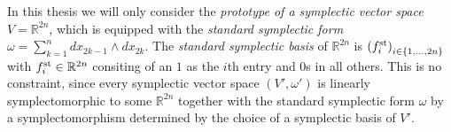 \documentclass[../SymplecticSimplices.tex]{subfiles}
\begin{document}
In this thesis we will only consider the \textit{prototype of a symplectic vector space} \( V = \mathbb{R}^{2n} \), which is equipped with the \textit{standard symplectic form} \( \omega = \sum\limits_{k=1}^{n} dx_{2k-1} \wedge dx_{2k} \). The \textit{standard symplectic basis} of \( \mathbb{R}^{2n} \) is \( \left( f^{\textnormal{st}}_i \right)_{i \in \left\lbrace 1, \dots, 2n \right\rbrace} \) with \( f^{\textnormal{st}}_i \in \mathbb{R}^{2n} \) consiting of an \( 1 \) as the \( i \)th entry and \( 0 \)s in all others. This is no constraint, since every symplectic vector space \( \left( V', \omega' \right) \) is linearly symplectomorphic to some \( \mathbb{R}^{2n} \) together with the standard symplectic form \( \omega \) by a symplectomorphism determined by the choice of a symplectic basis of \( V' \).
\end{document}
